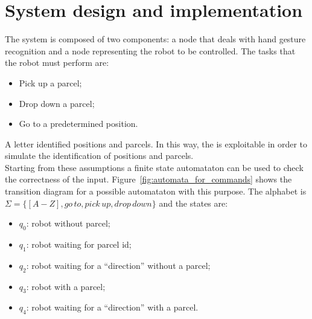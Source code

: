 \documentclass[../thesis.tex]{subfiles}
\begin{document}
\chapter{System design and implementation}\label{cap:system-design-and-implementation}
The system is composed of two components: a node that deals with  hand gesture recognition and a node representing the robot to be controlled. The tasks that the robot must perform are:
\begin{itemize}
    \item Pick up a parcel;
    \item Drop down a parcel;
    \item Go to a predetermined position.
\end{itemize}
A letter identified positions and parcels. In this way, the  is exploitable in order to simulate the identification of positions and parcels.\\
Starting from these assumptions a finite state automataton can be used to check the correctness of the input. Figure~\ref{fig:automata_for_commands} shows the transition diagram for a possible automataton with this purpose. The alphabet is $\Sigma = \{[A-Z], go\, to, pick\, up, drop\, down\}$ and the states are:
\begin{itemize}
    \item \textbf{$q_0$}: robot without parcel; 
    \item \textbf{$q_1$}: robot waiting for parcel id; 
    \item \textbf{$q_2$}: robot waiting for a ``direction'' without a parcel;
    \item \textbf{$q_3$}: robot with a parcel;
    \item \textbf{$q_4$}: robot waiting for a ``direction'' with a parcel.
\end{itemize}
\end{document}
